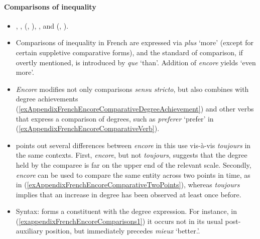 \paragraph{Comparisons of inequality}\label{appendixFrenchEncoreComparisons}
\begin{itemize}
	\item \textcite[s.v. \textit{encore}]{Dicctionnaire}, \textcite{Borillo1984}, \citeauthor{MosegaardHansen2002} (\citeyear{MosegaardHansen2002}, \citeyear[164–168]{MosegaardHansen2008}), \textcite{Muller1991}, \textcite[487–488]{Price2013} and \citeauthor{VictorriFuchs1992} (\citeyear{VictorriFuchs1992}, \citeyear{VictorriFuchs1996}).
	\item Comparisons of inequality in French are expressed via \textit{plus} \lq more' (except for certain suppletive comparative forms), and the standard of comparison, if overtly mentioned, is introduced by \textit{que} \lq than'. Addition of \textit{encore} yields \lq even more\rq{}.
		\item \textit{Encore} modifies not only comparisons \textit{sensu stricto}, but also combines with degree achievements  (\ref{exAppendixFrenchEncoreComparativeDegreeAchievement}) and other verbs that express a comparison of degrees, such as \textit{preferer} \lq prefer' in (\ref{exAppendixFrenchEncoreComparativeVerb}).
		\item \textcite[166–167]{MosegaardHansen2008} points out several differences between \textit{encore} in this use vis-à-vis \textit{toujours} in the same contexts. First, \textit{encore}, but not \textit{toujours}, suggests that the degree held by the comparee is far on the upper end of the relevant scale. Secondly, \textit{encore} can be used to compare the same entity across two points in time, as in (\ref{exAppendixFrenchEncoreComparativeTwoPoints}), whereas \textit{toujours} implies that an increase in degree has been observed at least once before. 
	\item Syntax: forms a constituent with the degree expression. For instance, in (\ref{exappendixFrenchEncoreComparisons1}) it occurs not in its usual post-auxiliary position, but immediately precedes \textit{mieux} \lq better.\rq{}.
\end{itemize}
